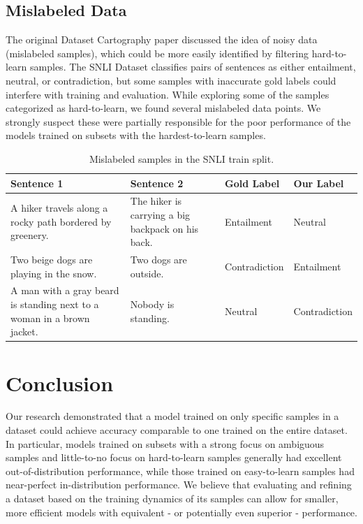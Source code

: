 \documentclass[11pt, a4paper, twocolumn]{article}
\begin{document}
	\subsection{Mislabeled Data}
	
	The original Dataset Cartography paper discussed the idea of noisy data (mislabeled samples), which could be more easily identified by filtering hard-to-learn samples. The SNLI Dataset classifies pairs of sentences as either entailment, neutral, or contradiction, but some samples with inaccurate gold labels could interfere with training and evaluation. While exploring some of the samples categorized as hard-to-learn, we found several mislabeled data points. We strongly suspect these were partially responsible for the poor performance of the models trained on subsets with the hardest-to-learn samples.
	
	\begin{table}[!ht]
		\centering
		\begin{tabular}{| m{4.5cm} | m{4.5cm}| m{2.5cm} | m{2.5cm} |}
			\hline
			Sentence 1                                                             & Sentence 2                                        & Gold Label    & Our Label     \\ \hline
			A hiker travels along a rocky path bordered by greenery.               & The hiker is carrying a big backpack on his back. & Entailment    & Neutral       \\ \hline 
			Two beige dogs are playing in the snow.                                & Two dogs are outside.                             & Contradiction & Entailment    \\ \hline
			A man with a gray beard is standing next to a woman in a brown jacket. & Nobody is standing.                               & Neutral       & Contradiction \\
			\hline
		\end{tabular}
		\caption{Mislabeled samples in the SNLI train split.}
	\end{table}
	
	\section{Conclusion}
	
	Our research demonstrated that a model trained on only specific samples in a dataset could achieve accuracy comparable to one trained on the entire dataset. In particular, models trained on subsets with a strong focus on ambiguous samples and little-to-no focus on hard-to-learn samples generally had excellent out-of-distribution performance, while those trained on easy-to-learn samples had near-perfect in-distribution performance. We believe that evaluating and refining a dataset based on the training dynamics of its samples can allow for smaller, more efficient models with equivalent - or potentially even superior - performance. 
	
\end{document}
